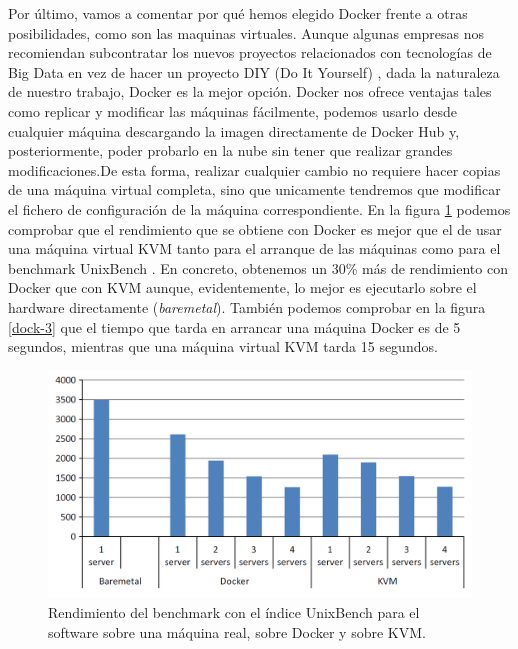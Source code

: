 Por último, vamos a comentar por qué hemos elegido Docker frente a otras
posibilidades, como son las maquinas virtuales. Aunque algunas empresas
nos recomiendan subcontratar los nuevos proyectos relacionados con
tecnologías de Big Data en vez de hacer un proyecto DIY (Do It Yourself) 
\cite{Dck-14}, dada la naturaleza de nuestro trabajo, Docker es la mejor
opción. Docker nos ofrece ventajas tales como replicar y modificar las
máquinas fácilmente, podemos usarlo desde cualquier máquina descargando
la imagen directamente de Docker Hub y, posteriormente, poder probarlo en
la nube sin tener que realizar grandes modificaciones.De esta forma,
realizar cualquier cambio no requiere hacer copias de una máquina virtual
completa, sino que unicamente tendremos que modificar el fichero de 
configuración de la máquina correspondiente. En la figura 
\ref{dock-2} \cite{Dck-15} podemos comprobar que el rendimiento que se
obtiene con Docker es mejor que el de usar una máquina virtual KVM tanto
para el arranque de las máquinas como para el benchmark UnixBench
\cite{Dck-15}. En concreto, obtenemos un 30\% más de rendimiento con
Docker que con KVM aunque, evidentemente, lo mejor es ejecutarlo sobre
el hardware directamente (\emph{baremetal}). También podemos comprobar en
la figura \ref{dock-3} \cite{Dck-15} que el tiempo que tarda en arrancar
una máquina Docker es de 5 segundos, mientras que una máquina virtual KVM
tarda 15 segundos.

\begin{figure}[htp]
\centering
\includegraphics[scale=0.30]{Imagenes/dockervsvm2.png}
\caption{Rendimiento del benchmark con el índice UnixBench para el software
  sobre una máquina real, sobre Docker y sobre KVM.}
\label{dock-2}
\end{figure}

